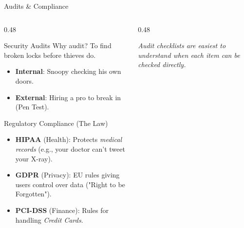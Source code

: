 \documentclass[aspectratio=169]{beamer}  %
\begin{document}
\begin{frame}{Audits \& Compliance}
    \begin{columns}[T]
        \begin{column}{0.48\textwidth}
            \begin{block}{Security Audits}
                \footnotesize
                Why audit? To find broken locks before thieves do.
                \begin{itemize}
                    \item \textbf{Internal}: Snoopy checking his own doors.
                    \item \textbf{External}: Hiring a pro to break in (Pen Test).
                \end{itemize}
            \end{block}
            \begin{alertblock}{Regulatory Compliance (The Law)}
                \footnotesize
                \begin{itemize}
                    \item \textbf{HIPAA} (Health): Protects \textit{medical records} (e.g., your doctor can't tweet your X-ray).
                    \item \textbf{GDPR} (Privacy): EU rules giving users control over data ("Right to be Forgotten").
                    \item \textbf{PCI-DSS} (Finance): Rules for handling \textit{Credit Cards}.
                \end{itemize}
            \end{alertblock}
        \end{column}
        \begin{column}{0.48\textwidth}
            \begin{center}
            \end{center}
            \vspace{-0.2em}
            \centering\footnotesize\emph{Audit checklists are easiest to understand when each item can be checked directly.}
            

\end{column}
\end{columns}
\end{frame}
\end{document}
